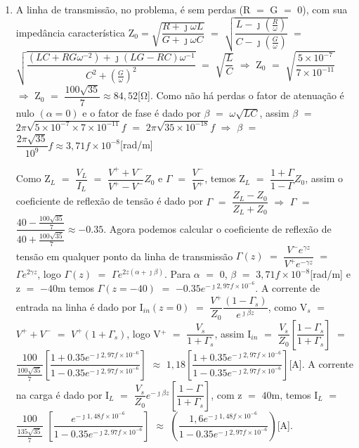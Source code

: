 \begin{center}\end{center}
\begin{enumerate}[1.]
\item A linha de transmissão, no problema, é sem perdas (R $=$ G $=$ $0$), com sua impedância característica Z$_{0} = \sqrt{\dfrac{R + \jmath \omega L}{G + \jmath \omega C}}$ $=$ $\sqrt{\dfrac{L - \jmath \left(\frac{R}{\omega}\right)}{C - \jmath \left(\frac{G}{\omega}\right)}}$ $=$ $\sqrt{\dfrac{(LC + RG\omega^{-2}) + \jmath (LG - RC)\omega^{-1}}{C^{2} + \left(\frac{G}{\omega}\right)^{2}}}$ $=$ $\sqrt{\dfrac{L}{C}}$ $\Rightarrow$ Z$_{0}$ $=$ $\sqrt{\dfrac{5 \times 10^{-7}}{7 \times 10^{-11}}}$ $\Rightarrow$ Z$_{0}$ $=$ $\dfrac{100\sqrt{35}}{7} \approx 84,52$[\si{\ohm}]. Como não há perdas o fator de atenuação é nulo $(\alpha = 0)$ e o fator de fase é dado por $\beta$ $=$ $\omega\sqrt{LC}$, assim $\beta$ $=$ $2\pi\sqrt{5 \times 10^{-7} \times 7 \times 10^{-11}}f$ $=$ $2\pi\sqrt{35 \times 10^{-18}}f$ $\Rightarrow$ $\beta$ $=$ $\dfrac{2\pi\sqrt{35}}{10^{9}}f \approx 3,71f \times 10^{-8}$[\si{\radian/\meter}]

Como Z$_{L}$ $=$ $\dfrac{V_{L}}{I_{L}}$ $=$ $\dfrac{V^{+} + V^{-}}{V^{+} - V^{-}}Z_{0}$ e $\Gamma$ $=$ $\dfrac{V^{-}}{V^{+}}$, temos Z$_{L}$ $=$ $\dfrac{1 + \Gamma}{1 - \Gamma}Z_{0}$, assim o coeficiente de reflexão de tensão é dado por $\Gamma$ $=$ $\dfrac{Z_{L} - Z_{0}}{Z_{L} + Z_{0}}$ $\Rightarrow$ $\Gamma$ $=$ $\dfrac{40 - \frac{100\sqrt{35}}{7}}{40 + \frac{100\sqrt{35}}{7}} \approx -0.35$. Agora podemos calcular o coeficiente de reflexão de tensão em qualquer ponto da linha de transmissão $\Gamma(z)$ $=$ $\dfrac{V^{-}e^{\gamma z}}{V^{+}e^{-\gamma z}}$ $=$ $\Gamma e^{2\gamma z}$, logo $\Gamma(z)$ $=$ $\Gamma e^{2z(\alpha + \jmath \beta)}$. Para $\alpha$ $=$ $0$, $\beta$ $=$ $3,71f \times 10^{-8}$[\si{\radian/\meter}] e z $=$ $-40$\si{\meter} temos $\Gamma(z = -40)$ $=$ $-0.35 e^{-\jmath 2,97f \times 10^{-6}}$. A corrente de entrada na linha é dado por I$_{in}(z = 0)$ $=$ $\dfrac{V^{+}}{Z_{0}}\dfrac{(1 - \Gamma_{s})}{e^{\jmath \beta z}}$, como V$_{s}$ $=$ $V^{+} + V^{-}$ $=$ $V^{+}(1 + \Gamma_{s})$, logo V$^{+}$ $=$ $\dfrac{V_{s}}{1 + \Gamma_{s}}$, assim I$_{in}$ $=$ $\dfrac{V_{s}}{Z_{0}}\left[\dfrac{1 - \Gamma_{s}}{1 + \Gamma_{s}}\right]$ $=$ $\dfrac{100}{\frac{100\sqrt{35}}{7}}$$\left[\dfrac{1 + 0.35 e^{-\jmath 2,97f \times 10^{-6}}}{1 - 0.35 e^{-\jmath 2,97f \times 10^{-6}}}\right]$ $\approx$ $1,18\left[\dfrac{1 + 0.35 e^{-\jmath 2,97f \times 10^{-6}}}{1 - 0.35 e^{-\jmath 2,97f \times 10^{-6}}}\right]$[\si{\ampere}]. A corrente na carga é dado por I$_{L}$ $=$ $\dfrac{V_{s}}{Z_{0}}e^{-\jmath\beta z}\left[\dfrac{1 - \Gamma}{1 + \Gamma_{s}}\right]$, com z $=$ $40$\si{\meter}, temos I$_{L}$ $=$ $\dfrac{100}{\frac{135\sqrt{35}}{7}}$ $\left[\dfrac{e^{-\jmath 1,48f \times 10^{-6}}}{1 - 0.35 e^{-\jmath 2,97f \times 10^{-6}}}\right]$ $\approx$ $\left(\dfrac{1,6e^{-\jmath 1,48f \times 10^{-6}}}{1 - 0.35 e^{-\jmath 2,97f \times 10^{-6}}}\right)$[\si{\ampere}].


\end{enumerate}
